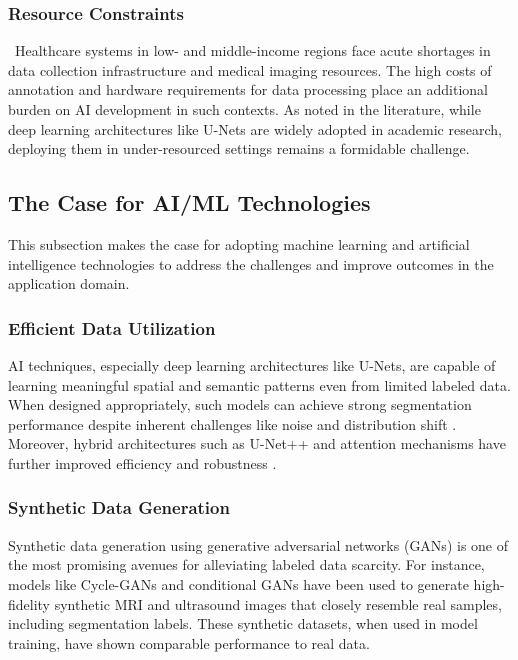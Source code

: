 \documentclass{article}
\begin{document}
\subsubsection{Resource Constraints}\
Healthcare systems in low- and middle-income regions face acute shortages in data collection infrastructure and medical imaging resources. The high costs of annotation and hardware requirements for data processing place an additional burden on AI development in such contexts. As noted in the literature, while deep learning architectures like U-Nets are widely adopted in academic research, deploying them in under-resourced settings remains a formidable challenge​.

\subsection{The Case for AI/ML Technologies}
This subsection makes the case for adopting machine learning and artificial intelligence technologies to address the challenges and improve outcomes in the application domain.

\subsubsection{Efficient Data Utilization}
AI techniques, especially deep learning architectures like U-Nets, are capable of learning meaningful spatial and semantic patterns even from limited labeled data. When designed appropriately, such models can achieve strong segmentation performance despite inherent challenges like noise and distribution shift​
\cite{vermaRoleDeepLearning2023}. Moreover, hybrid architectures such as U-Net++ and attention mechanisms have further improved efficiency and robustness​
\cite{zhouUNetNestedUNet2018}.

\subsubsection{Synthetic Data Generation}
Synthetic data generation using generative adversarial networks (GANs) is one of the most promising avenues for alleviating labeled data scarcity. For instance, models like Cycle-GANs and conditional GANs have been used to generate high-fidelity synthetic MRI and ultrasound images that closely resemble real samples, including segmentation labels. These synthetic datasets, when used in model training, have shown comparable performance to real data\cite{9324763,shinMedicalImageSynthesis2018}​.
\end{document}
